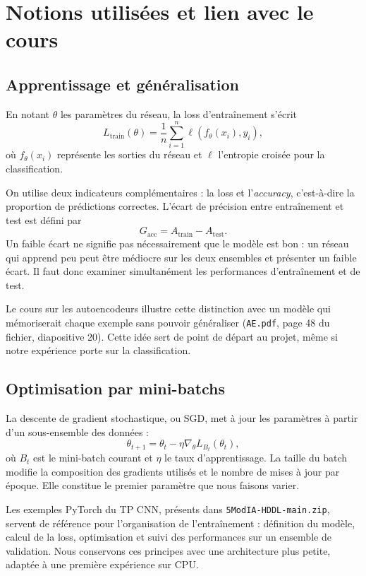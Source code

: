 \documentclass[11pt,a4paper]{article}
\begin{document}
\section{Notions utilisées et lien avec le cours}

\subsection{Apprentissage et généralisation}

En notant $\theta$ les paramètres du réseau, la loss d'entraînement s'écrit
\[
L_{\mathrm{train}}(\theta)
=\frac{1}{n}\sum_{i=1}^{n}\ell(f_\theta(x_i),y_i),
\]
où $f_\theta(x_i)$ représente les sorties du réseau et $\ell$ l'entropie croisée pour la classification.

On utilise deux indicateurs complémentaires : la loss et l'\emph{accuracy}, c'est-à-dire la proportion de prédictions correctes. L'écart de précision entre entraînement et test est défini par
\[
G_{\mathrm{acc}}=A_{\mathrm{train}}-A_{\mathrm{test}}.
\]
Un faible écart ne signifie pas nécessairement que le modèle est bon : un réseau qui apprend peu peut être médiocre sur les deux ensembles et présenter un faible écart. Il faut donc examiner simultanément les performances d'entraînement et de test.

Le cours sur les autoencodeurs illustre cette distinction avec un modèle qui mémoriserait chaque exemple sans pouvoir généraliser (\texttt{AE.pdf}, page 48 du fichier, diapositive 20). Cette idée sert de point de départ au projet, même si notre expérience porte sur la classification.

\subsection{Optimisation par mini-batchs}

La descente de gradient stochastique, ou SGD, met à jour les paramètres à partir d'un sous-ensemble des données :
\[
\theta_{t+1}=\theta_t-\eta\nabla_\theta L_{B_t}(\theta_t),
\]
où $B_t$ est le mini-batch courant et $\eta$ le taux d'apprentissage. La taille du batch modifie la composition des gradients utilisés et le nombre de mises à jour par époque. Elle constitue le premier paramètre que nous faisons varier.

Les exemples PyTorch du TP CNN, présents dans \texttt{5ModIA-HDDL-main.zip}, servent de référence pour l'organisation de l'entraînement : définition du modèle, calcul de la loss, optimisation et suivi des performances sur un ensemble de validation. Nous conservons ces principes avec une architecture plus petite, adaptée à une première expérience sur CPU.
\end{document}
